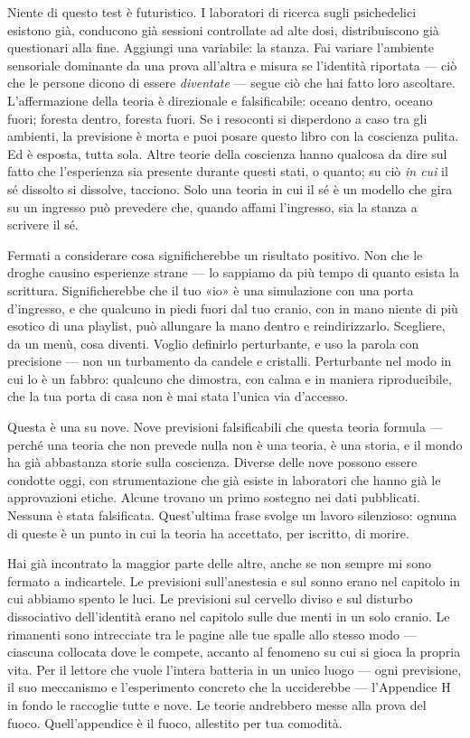 \documentclass[11pt, twoside, openright]{book}
\begin{document}
Niente di questo test è futuristico. I laboratori di ricerca sugli psichedelici esistono già, conducono già sessioni controllate ad alte dosi, distribuiscono già questionari alla fine. Aggiungi una variabile: la stanza. Fai variare l'ambiente sensoriale dominante da una prova all'altra e misura se l'identità riportata --- ciò che le persone dicono di essere \textit{diventate} --- segue ciò che hai fatto loro ascoltare. L'affermazione della teoria è direzionale e falsificabile: oceano dentro, oceano fuori; foresta dentro, foresta fuori. Se i resoconti si disperdono a caso tra gli ambienti, la previsione è morta e puoi posare questo libro con la coscienza pulita. Ed è esposta, tutta sola. Altre teorie della coscienza hanno qualcosa da dire sul fatto che l'esperienza sia presente durante questi stati, o quanto; su ciò \textit{in cui} il sé dissolto si dissolve, tacciono. Solo una teoria in cui il sé è un modello che gira su un ingresso può prevedere che, quando affami l'ingresso, sia la stanza a scrivere il sé.

Fermati a considerare cosa significherebbe un risultato positivo. Non che le droghe causino esperienze strane --- lo sappiamo da più tempo di quanto esista la scrittura. Significherebbe che il tuo «io» è una simulazione con una porta d'ingresso, e che qualcuno in piedi fuori dal tuo cranio, con in mano niente di più esotico di una playlist, può allungare la mano dentro e reindirizzarlo. Scegliere, da un menù, cosa diventi. Voglio definirlo perturbante, e uso la parola con precisione --- non un turbamento da candele e cristalli. Perturbante nel modo in cui lo è un fabbro: qualcuno che dimostra, con calma e in maniera riproducibile, che la tua porta di casa non è mai stata l'unica via d'accesso.

Questa è una su nove. Nove previsioni falsificabili che questa teoria formula --- perché una teoria che non prevede nulla non è una teoria, è una storia, e il mondo ha già abbastanza storie sulla coscienza. Diverse delle nove possono essere condotte oggi, con strumentazione che già esiste in laboratori che hanno già le approvazioni etiche. Alcune trovano un primo sostegno nei dati pubblicati. Nessuna è stata falsificata. Quest'ultima frase svolge un lavoro silenzioso: ognuna di queste è un punto in cui la teoria ha accettato, per iscritto, di morire.

Hai già incontrato la maggior parte delle altre, anche se non sempre mi sono fermato a indicartele. Le previsioni sull'anestesia e sul sonno erano nel capitolo in cui abbiamo spento le luci. Le previsioni sul cervello diviso e sul disturbo dissociativo dell'identità erano nel capitolo sulle due menti in un solo cranio. Le rimanenti sono intrecciate tra le pagine alle tue spalle allo stesso modo --- ciascuna collocata dove le compete, accanto al fenomeno su cui si gioca la propria vita. Per il lettore che vuole l'intera batteria in un unico luogo --- ogni previsione, il suo meccanismo e l'esperimento concreto che la ucciderebbe --- l'Appendice H in fondo le raccoglie tutte e nove. Le teorie andrebbero messe alla prova del fuoco. Quell'appendice è il fuoco, allestito per tua comodità.
\end{document}
